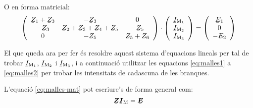 O en forma matricial:
\begin{equation}\label{eq:malles-mat}
  \left(
    \begin{array}{ccc}
      \cmplx{Z}_1 + \cmplx{Z}_3 & -\cmplx{Z}_3 & 0 \\
      -\cmplx{Z}_3 & \cmplx{Z}_2 + \cmplx{Z}_3+ \cmplx{Z}_4+ \cmplx{Z}_5 & -\cmplx{Z}_5 \\
      0 & -\cmplx{Z}_5 & \cmplx{Z}_5 + \cmplx{Z}_6 \\
    \end{array}
  \right)
  \cdot
  \left(
      \begin{array}{c}
        \cmplx{I}\ped{M_1} \\
        \cmplx{I}\ped{M_2} \\
        \cmplx{I}\ped{M_3} \\
      \end{array}
  \right)
  =
  \left(
      \begin{array}{c}
        \cmplx{E}_1 \\
        0 \\
        -\cmplx{E}_2 \\
      \end{array}
  \right)
\end{equation}

El que queda ara per fer és resoldre aquest sistema d'equacions lineals per tal de trobar $\cmplx{I}\ped{M_1}$, $\cmplx{I}\ped{M_2}$ i $\cmplx{I}\ped{M_3}$, i a continuació utilitzar les equacions \eqref{eq:malles1} a \eqref{eq:malles2} per trobar les intensitats de cadascuna de les branques.


L'equació \eqref{eq:malles-mat} pot escriure's de forma general com:
\begin{equation}
  \mcmplx{Z} \mcmplx{I}\ped{M} = \mcmplx{E}
\end{equation}

